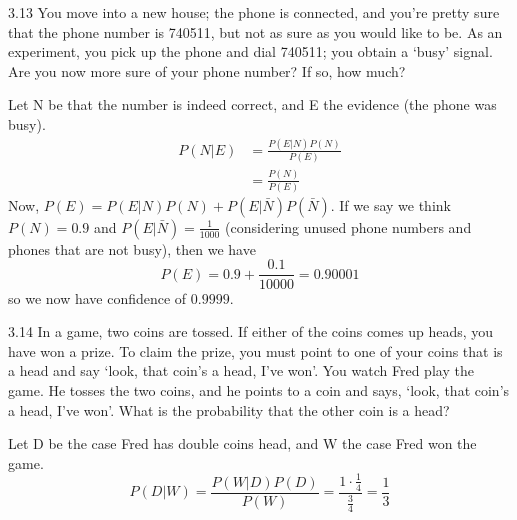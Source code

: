\documentclass[12pt, a4paper]{article}
\begin{document}
\begin{prob}{3.13}
    You move into a new house; the phone is connected, and you're pretty sure that the phone number is 740511, but not as sure as you would like to be. As an experiment, you pick up the phone and dial 740511; you obtain a `busy' signal. Are you now more sure of your phone number? If so, how much?
\end{prob}
\begin{sol}
    Let N be that the number is indeed correct, and E the evidence (the phone was busy).
    \begin{align*}
        P(N | E) &= \frac{P(E | N)P(N)}{P(E)} \\
        &= \frac{P(N)}{P(E)}
    \end{align*}
    Now, $P(E) = P(E|N)P(N) + P(E|\bar{N})P(\bar{N})$. If we say we think $P(N) = 0.9$ and $P(E|\bar{N}) = \frac{1}{1000}$ (considering unused phone numbers and phones that are not busy), then we have
    $$P(E) = 0.9 + \frac{0.1}{10000} = 0.90001$$ so we now have confidence of $0.9999$.
\end{sol}
\bigskip

\begin{prob}{3.14}
In a game, two coins are tossed. If either of the coins comes up heads, you have won a prize. To claim the prize, you must point to one of your coins that is a head and say ‘look, that coin’s a head, I’ve won’. You watch Fred play the game. He tosses the two coins, and he points to a coin and says, ‘look, that coin’s a head, I’ve won’. What is the probability that the other coin is a head?
\end{prob}
\begin{sol}
    Let D be the case Fred has double coins head, and W the case Fred won the game.
    $$P(D|W) = \frac{P(W|D)P(D)}{P(W)} = \frac{1 \cdot \frac{1}{4}}{\frac{3}{4}} = \frac{1}{3}$$
\end{sol}
\bigskip
\end{document}
